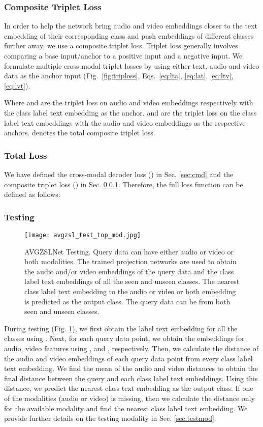 \documentclass[10pt,twocolumn,letterpaper]{article}
\begin{document}
\subsubsection{Composite Triplet Loss}\label{sec:ct}
In order to help the network bring audio and video embeddings closer to the text embedding of their corresponding class and push embeddings of different classes further away, we use a composite triplet loss. Triplet loss generally involves comparing a base input/anchor to a positive input and a negative input. We formulate multiple cross-modal triplet losses by using either text, audio and video data as the anchor input (Fig.~\ref{fig:triploss}, Eqs.~\ref{eq:lta}, \ref{eq:lat}, \ref{eq:ltv}, \ref{eq:lvt}).





Where  and  are the triplet loss on audio and video embeddings respectively with the class label text embedding as the anchor.  and  are the triplet loss on the class label text embeddings with the audio and video embeddings as the respective anchors.  denotes the total composite triplet loss.

\subsubsection{Total Loss}
We have defined the cross-modal decoder loss () in Sec. \ref{sec:cmd} and the composite triplet loss () in Sec. \ref{sec:ct}. Therefore, the full loss function can be defined as follows:

\subsubsection{Testing}
\begin{figure}[t]
  \centering
  \texttt{[image: avgzsl\_test\_top\_mod.jpg]}
\caption{AVGZSLNet Testing. Query data can have either audio or video or both modalities. The trained projection networks are used to obtain the audio and/or video embeddings of the query data and the class label text embeddings of all the seen and unseen classes. The nearest class label text embedding to the audio or video or both embedding is predicted as the output class. The query data can be from both seen and unseen classes.}
\label{fig:test}
  \vspace{-10pt}
\end{figure}
During testing (Fig. \ref{fig:test}), we first obtain the label text embedding for all the classes using . Next, for each query data point, we obtain the embeddings for audio, video features using , and , respectively. Then, we calculate the distance of the audio and video embeddings of each query data point from every class label text embedding. We find the mean of the audio and video distances to obtain the final distance between the query and each class label text embeddings. Using this distance, we predict the nearest class text embedding as the output class. If one of the modalities (audio or video) is missing, then we calculate the distance only for the available modality and find the nearest class label text embedding. We provide further details on the testing modality in Sec. \ref{sec:testmod}.
\end{document}

